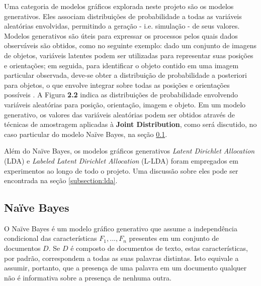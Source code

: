 Uma categoria de modelos gráficos explorada neste projeto são os modelos generativos. Eles associam distribuições de probabilidade a todas as variáveis aleatórias envolvidas, permitindo a geração - i.e. simulação - de seus valores. Modelos generativos são úteis para expressar os processos pelos quais dados observáveis são obtidos, como no seguinte exemplo: dado um conjunto de imagens de objetos, variáveis latentes podem ser utilizadas para representar suas posições e orientações; em seguida, para identificar o objeto contido em uma imagem particular observada, deve-se obter a distribuição de probabilidade a posteriori para objetos, o que envolve integrar sobre todas as posições e orientações possíveis \cite{bishop}. A Figura \textbf{2.2} indica as distribuições de probabilidade envolvendo variáveis aleatórias para posição, orientação, imagem e objeto. Em um modelo generativo, os valores das variáveis aleatórias podem ser obtidos através de técnicas de amostragem aplicadas à \textbf{Joint Distribution}, como será discutido, no caso particular do modelo Naïve Bayes, na seção \ref{subsection:naive}.


Além do Naïve Bayes, os modelos gráficos generativos \emph{Latent Dirichlet Allocation} (LDA) e \emph{Labeled Latent Dirichlet Allocation} (L-LDA) foram empregados em experimentos ao longo de todo o projeto. Uma discussão sobre eles pode ser encontrada na seção \ref{subsection:lda}. %

\subsection{Naïve Bayes}
\label{subsection:naive}

O Naïve Bayes é um modelo gráfico generativo que assume a independência condicional das características \ensuremath{F_1, ..., F_n} presentes em um conjunto de documentos \ensuremath{D}. Se \ensuremath{D} é composto de documentos de texto, estas características, por padrão, correspondem a todas as suas palavras distintas. Isto equivale a assumir, portanto, que a presença de uma palavra em um documento qualquer não é informativa sobre a presença de nenhuma outra. 

